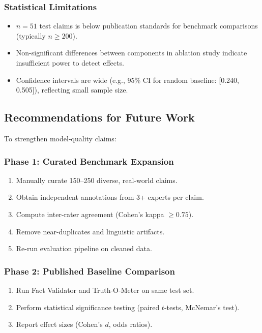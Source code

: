 \documentclass[12pt,a4paper,twoside]{article}
\begin{document}
\subsubsection{Statistical Limitations}

\begin{itemize}
    \item $n=51$ test claims is below publication standards for benchmark comparisons (typically $n \geq 200$).
    \item Non-significant differences between components in ablation study indicate insufficient power to detect effects.
    \item Confidence intervals are wide (e.g., 95\% CI for random baseline: [0.240, 0.505]), reflecting small sample size.
\end{itemize}

\subsection{Recommendations for Future Work}

To strengthen model-quality claims:

\subsubsection{Phase 1: Curated Benchmark Expansion}

\begin{enumerate}
    \item Manually curate 150--250 diverse, real-world claims.
    \item Obtain independent annotations from 3+ experts per claim.
    \item Compute inter-rater agreement (Cohen's kappa $\geq 0.75$).
    \item Remove near-duplicates and linguistic artifacts.
    \item Re-run evaluation pipeline on cleaned data.
\end{enumerate}

\subsubsection{Phase 2: Published Baseline Comparison}

\begin{enumerate}
    \item Run Fact Validator and Truth-O-Meter on same test set.
    \item Perform statistical significance testing (paired $t$-tests, McNemar's test).
    \item Report effect sizes (Cohen's $d$, odds ratios).
\end{enumerate}
\end{document}
